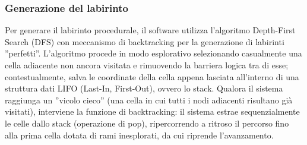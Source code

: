 \documentclass[a4paper,12pt]{article}
\begin{document}
\subsubsection*{Generazione del labirinto}
Per generare il labirinto procedurale, il software utilizza l’algoritmo Depth-First Search (DFS) con meccanismo di backtracking per la generazione di labirinti ”perfetti”. L’algoritmo procede in modo esplorativo selezionando casualmente una cella adiacente non ancora visitata e rimuovendo la barriera logica tra di esse; contestualmente, salva le coordinate della cella appena lasciata all'interno di una struttura dati LIFO (Last-In, First-Out), ovvero lo stack. Qualora il sistema raggiunga un ”vicolo cieco” (una cella in cui tutti i nodi adiacenti risultano già visitati), interviene la funzione di backtracking: il sistema estrae sequenzialmente le celle dallo stack (operazione di pop), ripercorrendo a ritroso il percorso fino alla prima cella dotata di rami inesplorati, da cui riprende l'avanzamento.
\end{document}

